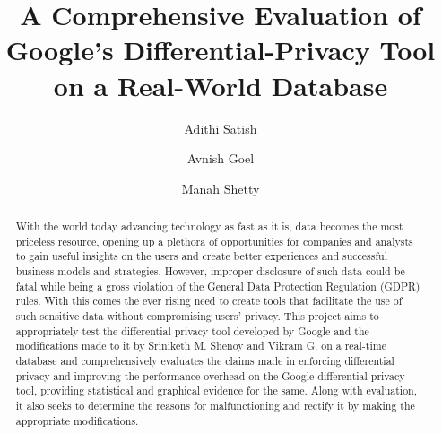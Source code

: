 \documentclass[acmsmall]{acmart}
\begin{document}

\title[Privacy Preservation Analytics]{A Comprehensive Evaluation of Google's Differential-Privacy Tool on a Real-World Database}


\author{Adithi Satish}

\author{Avnish Goel}

\author{Manah Shetty}

\renewcommand{\shortauthors}{Adithi Satish and Manah Shetty, et al.}

\begin{abstract}
  With the world today advancing technology as fast as it is, data becomes the most priceless
resource, opening up a plethora of opportunities for companies and analysts to gain useful insights on the users and create better experiences and successful business models and strategies. However, improper disclosure of such data could be fatal while being a gross violation of the General Data Protection Regulation (GDPR) rules.
With this comes the ever rising need to create tools that facilitate the use of such sensitive data
without compromising users’ privacy. \newline
This project aims to appropriately test the differential privacy tool developed by Google and the
modifications made to it by Sriniketh M. Shenoy and Vikram G. on a real-time database and
comprehensively evaluates the claims made in enforcing differential privacy and improving the
performance overhead on the Google differential privacy tool, providing statistical and graphical
evidence for the same. Along with evaluation, it also seeks to determine the reasons for
malfunctioning and rectify it by making the appropriate modifications.
\end{abstract}
\end{document}
